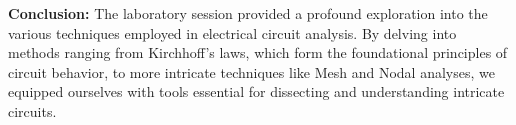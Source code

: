 \documentclass{article}
\begin{document}





\begin{flushleft}
\textbf{Conclusion:}
The laboratory session provided a profound exploration into the various techniques employed in electrical circuit analysis. By delving into methods ranging from Kirchhoff's laws, which form the foundational principles of circuit behavior, to more intricate techniques like Mesh and Nodal analyses, we equipped ourselves with tools essential for dissecting and understanding intricate circuits.
 \end{flushleft}
\end{document}
